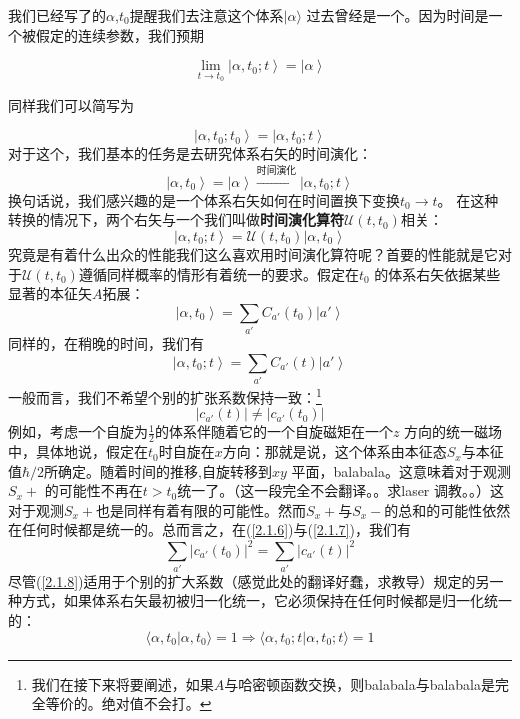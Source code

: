 \documentclass[UTF8,twoside]{ctexart}
\begin{document}
\noindent 我们已经写了的$\alpha$,$t_0$提醒我们去注意这个体系$|\alpha\rangle$ 过去曾经是一个。因为时间是一个被假定的连续参数，我们预期

\begin{equation}
\lim_{t\rightarrow t_0}\left|\alpha, t_0; t\right\rangle=\left|\alpha\right\rangle
\end{equation}

\noindent 同样我们可以简写为

\begin{equation}
\left|\alpha, t_0; t_0\right\rangle = \left|\alpha, t_0; t\right\rangle
\end{equation}
\noindent 对于这个，我们基本的任务是去研究体系右矢的时间演化：
\begin{equation}
\left|\alpha, t_0 \right\rangle =\left| \alpha\right\rangle\xrightarrow{\text{时间演化}}\left|\alpha, t_0; t\right\rangle
\end{equation}
\noindent 换句话说，我们感兴趣的是一个体系右矢如何在时间置换下变换$t_0\rightarrow t $。
\noindent 在这种转换的情况下，两个右矢与一个我们叫做{\textbf{时间演化算符}}$\mathcal{U} (t,t_0)$相关：
\begin{equation}
\left|\alpha, t_0; t\right\rangle=\mathcal{U}(t,t_0)\left|\alpha, t_0\right\rangle
\end{equation}
\noindent 究竟是有着什么出众的性能我们这么喜欢用时间演化算符呢？首要的性能就是它对于$\mathcal{U}(t,t_0)$遵循同样概率的情形有着统一的要求。假定在$t_0$ 的体系右矢依据某些显著的本征矢$A$拓展：
\begin{equation}\label{2.1.6}
\left|\alpha, t_0\right\rangle=\sum_{a'} C_{a'}(t_0)\left|a'\right\rangle
\end{equation}
\noindent 同样的，在稍晚的时间，我们有
\begin{equation}\label{2.1.7}
\left|\alpha, t_0; t\right\rangle=\sum_{a'} C_{a'}(t)\left|a'\right\rangle
\end{equation}
\noindent 一般而言，我们不希望个别的扩张系数保持一致：\footnote{我们在接下来将要阐述，如果$A$与哈密顿函数交换，则balabala与balabala是完全等价的。绝对值不会打。}
\begin{equation} \label{2.1.8}
\left|c_{a'}(t)\right| \neq \left|c_{a'}(t_0)\right|
\end{equation}
\noindent 例如，考虑一个自旋为$\frac{1}{2}$的体系伴随着它的一个自旋磁矩在一个$z$ 方向的统一磁场中，具体地说，假定在$t_0$时自旋在$x$方向：那就是说，这个体系由本征态$S_x$与本征值$\hbar/2 $所确定。随着时间的推移,自旋转移到$xy$ 平面，balabala。这意味着对于观测$S_x +$ 的可能性不再在$t>t_0$统一了。（这一段完全不会翻译。。求laser 调教。。）这对于观测$S_x +$也是同样有着有限的可能性。然而$S_x +$与$S_x -$的总和的可能性依然在任何时候都是统一的。总而言之，在(\ref{2.1.6})与(\ref{2.1.7})，我们有
\begin{equation}
\sum_{a'}|c_{a'}(t_0)|^2 = \sum_{a'}|c_{a'}(t)|^2
\end{equation}
\noindent 尽管(\ref{2.1.8})适用于个别的扩大系数（感觉此处的翻译好蠢，求教导）规定的另一种方式，如果体系右矢最初被归一化统一，它必须保持在任何时候都是归一化统一的：
\begin{equation}
\langle \alpha, t_0|\alpha, t_0\rangle = 1 \Rightarrow \langle\alpha, t_0;t|\alpha, t_0;t\rangle = 1
\end{equation}
\end{document}
